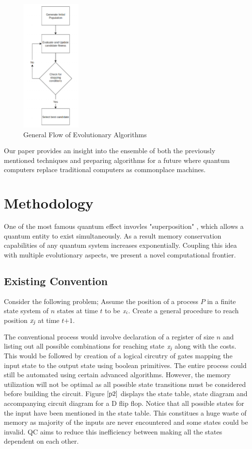 \documentclass[conference]{IEEEtran}
\begin{document}
\begin{figure}[!t]
\centering\includegraphics[height=6.75cm]{p1.png}
\caption{General Flow of Evolutionary Algorithms}
\label{p1}
\end{figure}

Our paper provides an insight into the ensemble of both the previously mentioned techniques and preparing algorithms for a future where quantum computers replace traditional computers as commonplace machines. 

\section{Methodology}

One of the most famous quantum effect invovles "superposition" \cite{rj}, which allows a quantum entity to exist simultaneously. As a result memory conservation capabilities of any quantum system increases exponentially. Coupling this idea with multiple evolutionary aspects, we present a novel computational frontier. 

\subsection{Existing Convention}

Consider the following problem; Assume the position of a process $\textit{P}$ in a finite state system of $\textit{n}$ states at time $\textit{t}$ to be $\textit{x\textsubscript{i}}$. Create a general procedure to reach position $\textit{x\textsubscript{j}}$ at time $\textit{t+1}$.

The conventional process would involve declaration of a register of size $\textit{n}$ and listing out all possible combinations for reaching state $\textit{x\textsubscript{j}}$ along with the costs. This would be followed by creation of a logical circutry of gates mapping the input state to the output state using boolean primitives. The entire process could still be automated using certain advanced algorithms. However, the memory utilization will not be optimal as all possible state transitions must be considered before building the circuit. Figure $\ref{p2}$ displays the state table, state diagram and accompanying circuit diagram for a D flip flop. Notice that all possible states for the input have been mentioned in the state table. This constitues a huge waste of memory as majority of the inputs are never encountered and some states could be invalid. QC aims to reduce this inefficiency between making all the states dependent on each other. 
\end{document}
